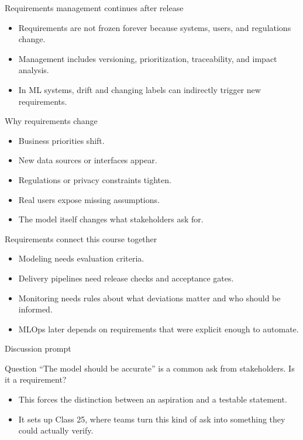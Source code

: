 \begin{frame}{Requirements management continues after release}
\begin{itemize}
\item Requirements are not frozen forever because systems, users, and regulations change.
\item Management includes versioning, prioritization, traceability, and impact analysis.
\item In ML systems, drift and changing labels can indirectly trigger new requirements.
\end{itemize}
\coursefooter
\end{frame}

\begin{frame}{Why requirements change}
\begin{itemize}
\item Business priorities shift.
\item New data sources or interfaces appear.
\item Regulations or privacy constraints tighten.
\item Real users expose missing assumptions.
\item The model itself changes what stakeholders ask for.
\end{itemize}
\coursefooter
\end{frame}

\begin{frame}{Requirements connect this course together}
\begin{itemize}
\item Modeling needs evaluation criteria.
\item Delivery pipelines need release checks and acceptance gates.
\item Monitoring needs rules about what deviations matter and who should be informed.
\item MLOps later depends on requirements that were explicit enough to automate.
\end{itemize}
\coursefooter
\end{frame}

\begin{frame}{Discussion prompt}
\begin{block}{Question}
``The model should be accurate'' is a common ask from stakeholders. Is it a requirement?
\end{block}
\begin{itemize}
\item This forces the distinction between an aspiration and a testable statement.
\item It sets up Class 25, where teams turn this kind of ask into something they could actually verify.
\end{itemize}
\coursefooter
\end{frame}

